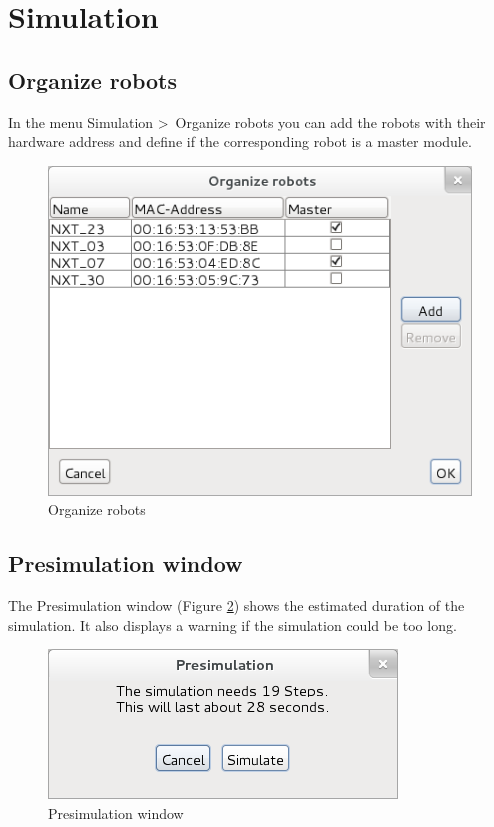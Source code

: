 \documentclass[%
  a4paper,%
  11pt,%
  blue,%
  hyperref	%
  ]{tubsartcl}
\begin{document}
\section{Simulation}

\subsection{Organize robots}
In the menu Simulation \textgreater\ Organize robots you can add the robots with their hardware address and define if the corresponding robot is a master module.
\begin{figure}[!htb]
\begin{center}
\includegraphics[scale=0.45]{graphics_gui/organize_robots.png}
\end{center}
\caption{Organize robots}
\label{pic:organize_robots}
\end{figure}

\subsection{Presimulation window}
The Presimulation window (Figure \ref{pic:presimulation}) shows the estimated duration of the simulation. It also displays a warning if the simulation could be too long.
\begin{figure}[!htb]
\begin{center}
\includegraphics[scale=0.4]{graphics_gui/presimulation.png}
\end{center}
\caption{Presimulation window}
\label{pic:presimulation}
\end{figure}
\end{document}
